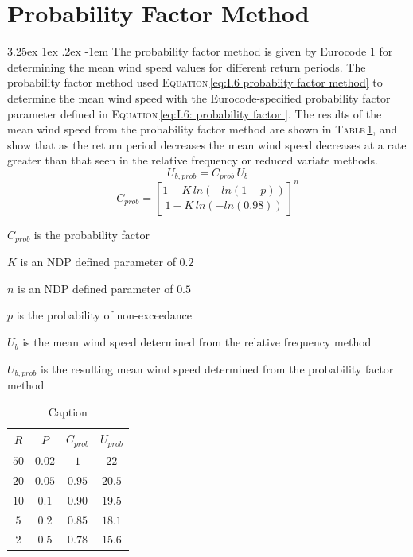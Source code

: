 \documentclass[11pt,a4paper,titlepage]{report}
\makeatletter
\renewcommand\paragraph{\@startsection{paragraph}{5}{\z@}%
  {3.25ex \@plus1ex \@minus.2ex}%
  {-1em}%
  {\normalfont\normalsize\bfseries}}
\makeatother
\begin{document}
\section{Probability Factor Method}
\paragraph{}The probability factor method is given by Eurocode 1 for determining the mean wind speed values for different return periods. The probability factor method used \textsc{Equation}\,\eqref{eq:I.6 probabiity factor method} to determine the mean wind speed with the Eurocode-specified probability factor parameter defined in \textsc{Equation}\,\eqref{eq:I.6: probability factor }. The results of the mean wind speed from the probability factor method are shown in \textsc{Table}\,\ref{tab:probability factor method}, and show that as the return period decreases the mean wind speed decreases at a rate greater than that seen in the relative frequency or reduced variate methods. 
\begin{equation}
    U_{b,prob}=C_{prob}\,U_b
    \label{eq:I.6 probabiity factor method}
\end{equation}
\begin{equation}
    C_{prob}=\left[\dfrac{1-K\,ln(-ln(1-p))}{1-K\,ln(-ln(0.98))}\right]^n
    \label{eq:I.6: probability factor }
\end{equation}
\begin{itemize}
    \begin{small}
    \item $C_{prob}$ is the probability factor 
    \item $K$ is an NDP defined parameter of $0.2$
    \item $n$ is an NDP defined parameter of $0.5$
    \item $p$ is the probability of non-exceedance
    \item $U_b$ is the mean wind speed determined from the relative frequency method
    \item $U_{b,prob}$ is the resulting mean wind speed determined from the probability factor method
    \end{small}
\end{itemize}
\begin{table}[]
    \centering
    \begin{tabular}{c|c|c|c}
        $R$ & $P$ & $C_{prob}$ & $U_{prob}$ \\
        \hline
        $50$ & $0.02$ & $1$ & $22$\\
        $20$ & $0.05$ & $0.95$ & $20.5$\\
        $10$ & $0.1$ & $0.90$ & $19.5$\\
        $5$ & $0.2$ & $0.85$ & $18.1$\\
        $2$ & $0.5$ & $0.78$ & $15.6$\\
    \end{tabular}
    \caption{Caption}
    \label{tab:probability factor method}
\end{table}
\end{document}

